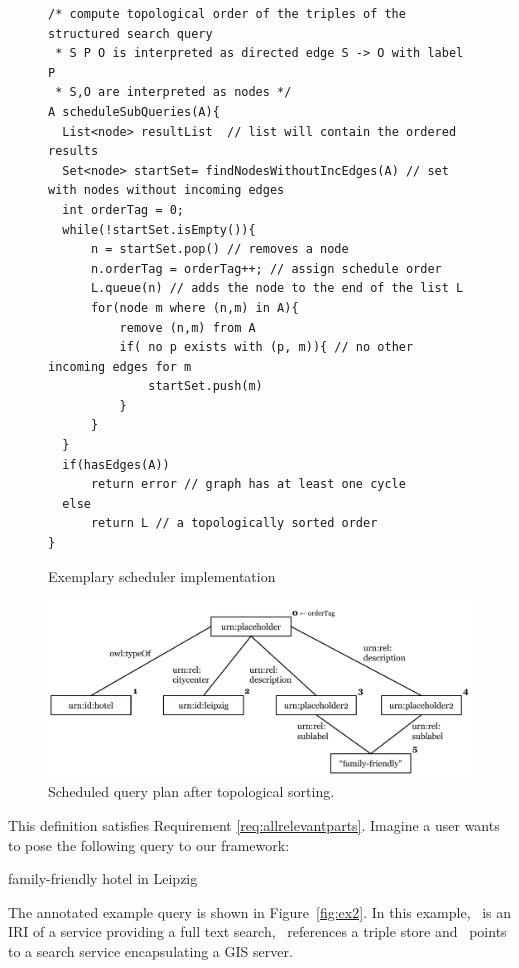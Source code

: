 \begin{figure}[p!]
\lstset{language=Java}
\begin{lstlisting}[frame=single]
/* compute topological order of the triples of the structured search query 
 * S P O is interpreted as directed edge S -> O with label P 
 * S,O are interpreted as nodes */
A scheduleSubQueries(A){
  List<node> resultList  // list will contain the ordered results
  Set<node> startSet= findNodesWithoutIncEdges(A) // set with nodes without incoming edges
  int orderTag = 0;
  while(!startSet.isEmpty()){
      n = startSet.pop() // removes a node 
      n.orderTag = orderTag++; // assign schedule order
      L.queue(n) // adds the node to the end of the list L
      for(node m where (n,m) in A){
          remove (n,m) from A
          if( no p exists with (p, m)){ // no other incoming edges for m
              startSet.push(m) 
          }
      }
  }
  if(hasEdges(A))
      return error // graph has at least one cycle
  else 
      return L // a topologically sorted order
}
\end{lstlisting}
\caption{Exemplary scheduler implementation}
\label{fig:scheduler}
\end{figure}

\begin{figure}[p!tb]
\centering
\includegraphics[width=\textwidth]{chapter_four/SEMANTiCS_architecture/query_plan_tree.pdf}
\caption{Scheduled query plan after topological sorting.}
\label{queryplantree}
\end{figure}



This definition satisfies Requirement \ref{req:allrelevantparts}.
Imagine a user wants to pose the following query to our framework: 
\begin{ex}
family-friendly hotel in Leipzig
\end{ex}

The annotated example query is shown in Figure~\ref{fig:ex2}.
In this example, \ssfulltext\ is an IRI of a service providing a full text search, \sstriplestore\ references a triple store and \ssgeo\ points to a search service encapsulating a GIS server.


